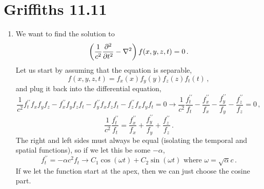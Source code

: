 \documentclass[11pt]{article}
\begin{document}
\newpage

\section*{Griffiths 11.11}
\begin{enumerate}[label=\alph*)]
\item We want to find the solution to 
\[\left(\frac{1}{c^2}\pdv[2]{t} - \nabla^2\right)f(x,y,z,t) = 0 \, .\]
Let us start by assuming that the equation is separable, 
\[f(x,y,z,t) = f_x(x)f_y(y)f_z(z)f_t(t) \, ,\]
and plug it back into the differential equation,
\[\frac{1}{c^2}f^{\prime\prime}_t f_xf_yf_z - f^{\prime\prime}_xf_yf_zf_t - f^{\prime\prime}_yf_xf_zf_t - f^{\prime\prime}_zf_xf_yf_t = 0 \rightarrow \frac{1}{c^2}\frac{f^{\prime \prime}_t}{f_t} - \frac{f^{\prime \prime}_x}{f_x} - \frac{f^{\prime \prime}_y}{f_y} - \frac{f^{\prime \prime}_z}{f_z} = 0\, ,\]
\[\frac{1}{c^2}\frac{f^{\prime \prime}_t}{f_t} = \frac{f^{\prime \prime}_x}{f_x} + \frac{f^{\prime \prime}_y}{f_y} + \frac{f^{\prime \prime}_z}{f_z} \, .\]
The right and left sides must always be equal (isolating the temporal and spatial functions), so if we let this be some $-\alpha$, 
\[f^{\prime \prime}_t = -\alpha c^2 f_t \rightarrow C_1 \cos(\omega t) + C_2 \sin(\omega t) \text{ where } \omega = \sqrt{\alpha}c \, .\]
If we let the function start at the apex, then we can just choose the cosine part. 


\end{enumerate}
\end{document}
